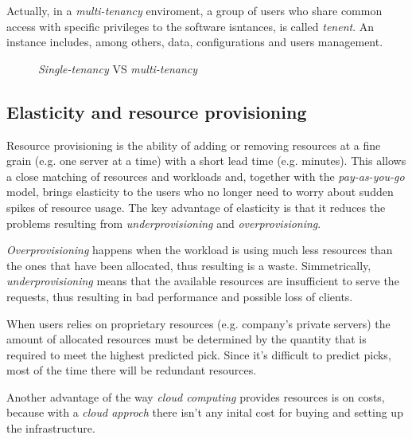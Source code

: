 Actually, in a \emph{multi-tenancy} enviroment, a group of users who share
common access with specific privileges to the software isntances, is called
\emph{tenent}. An instance includes, among others, data, configurations and
users management.

\newpage
\begin{figure}[ht!]
    \centering
    \hspace{2mm}
    \hspace{2mm}
    \caption{\emph{Single-tenancy} VS \emph{multi-tenancy}}
\end{figure}

\subsection{Elasticity and resource provisioning}
Resource provisioning is the ability of adding or removing resources at a fine
grain (e.g. one server at a time) with a short lead time (e.g. minutes). This
allows a close matching of resources and workloads and, together with the
\emph{pay-as-you-go} model, brings elasticity to the users who no longer need
to worry about sudden spikes of resource usage. The key advantage of elasticity
is that it reduces the problems resulting from \emph{underprovisioning} and
\emph{overprovisioning}.

\emph{Overprovisioning} happens when the workload is using much less resources
than the ones that have been allocated, thus resulting is a waste.
Simmetrically, \emph{underprovisioning} means that the available resources are
insufficient to serve the requests, thus resulting in bad performance and
possible loss of clients.

When users relies on proprietary resources (e.g. company's private servers) the
amount of allocated resources must be determined by the quantity that is
required to meet the highest predicted pick. Since it's difficult to predict
picks, most of the time there will be redundant resources.

Another advantage of the way \emph{cloud computing} provides resources is on costs,
because with a \emph{cloud approch} there isn't any inital cost for buying and
setting up the infrastructure.

